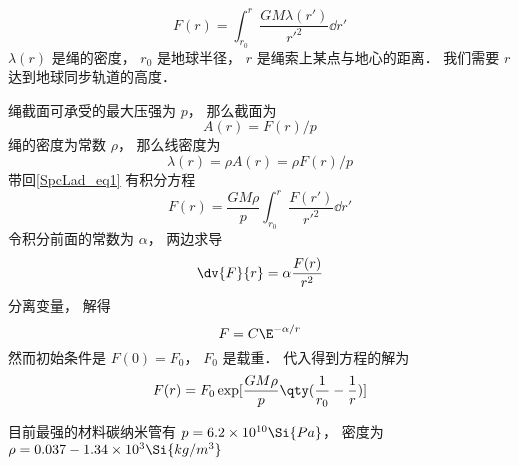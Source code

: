 
\begin{equation}\label{SpcLad_eq1}
F(r) = \int_{r_0}^{r} \frac{GM\lambda(r')}{r'^2} \dd{r'}
\end{equation}
$\lambda(r)$ 是绳的密度， $r_0$ 是地球半径， $r$ 是绳索上某点与地心的距离． 我们需要 $r$ 达到地球同步轨道的高度．

绳截面可承受的最大压强为 $p$， 那么截面为
\begin{equation}
A(r) = F(r)/p
\end{equation}
绳的密度为常数 $\rho$， 那么线密度为
\begin{equation}
\lambda(r) = \rho A(r) = \rho F(r)/p
\end{equation}
带回\autoref{SpcLad_eq1} 有积分方程
\begin{equation}
F(r) = \frac{GM\rho}{p} \int_{r_0}^{r} \frac{F(r')}{r'^2} \dd{r'}
\end{equation}
令积分前面的常数为 $\alpha$， 两边求导
\begin{equation}
\dv{F}{r} = \alpha \frac{F(r)}{r^2}
\end{equation}
分离变量， 解得
\begin{equation}
F = C\E^{-\alpha/r}
\end{equation}
然而初始条件是 $F(0) = F_0$， $F_0$ 是载重． 代入得到方程的解为
\begin{equation}
F(r) = F_0 \exp[\frac{GM\rho}{p} \qty(\frac{1}{r_0} - \frac{1}{r})]
\end{equation}

目前最强的材料碳纳米管有 $p = 6.2\times 10^{10} \Si{Pa}$， 密度为 $\rho = 0.037-1.34\times 10^{3} \Si{kg/m^3}$
